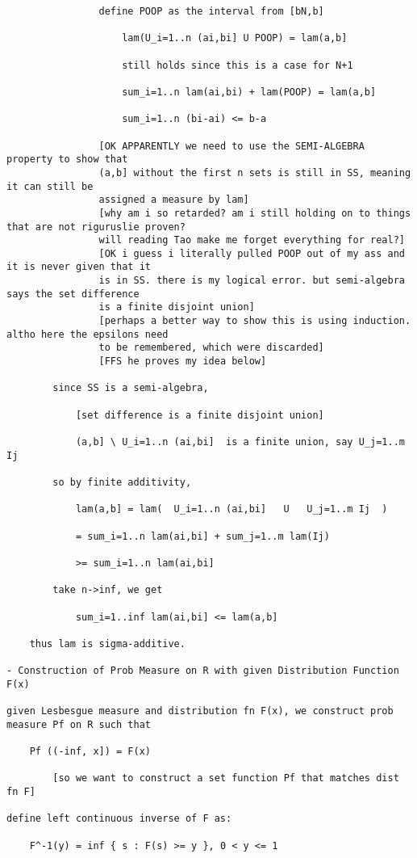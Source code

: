 \documentclass{article}
\begin{document}
\begin{flushleft}
\begin{verbatim}
				define POOP as the interval from [bN,b]
				
					lam(U_i=1..n (ai,bi] U POOP) = lam(a,b] 
					
					still holds since this is a case for N+1
					
					sum_i=1..n lam(ai,bi) + lam(POOP) = lam(a,b]
					
					sum_i=1..n (bi-ai) <= b-a
					
				[OK APPARENTLY we need to use the SEMI-ALGEBRA property to show that
				(a,b] without the first n sets is still in SS, meaning it can still be
				assigned a measure by lam]
				[why am i so retarded? am i still holding on to things that are not riguruslie proven?
				will reading Tao make me forget everything for real?]
				[OK i guess i literally pulled POOP out of my ass and it is never given that it
				is in SS. there is my logical error. but semi-algebra says the set difference
				is a finite disjoint union]
				[perhaps a better way to show this is using induction. altho here the epsilons need
				to be remembered, which were discarded]
				[FFS he proves my idea below]
			
		since SS is a semi-algebra, 
		
			[set difference is a finite disjoint union]
		
			(a,b] \ U_i=1..n (ai,bi]  is a finite union, say U_j=1..m Ij 
			
		so by finite additivity,
		
			lam(a,b] = lam(  U_i=1..n (ai,bi]   U   U_j=1..m Ij  ) 
			
			= sum_i=1..n lam(ai,bi] + sum_j=1..m lam(Ij)
			
			>= sum_i=1..n lam(ai,bi]
			
		take n->inf, we get
		
			sum_i=1..inf lam(ai,bi] <= lam(a,b]
			
	thus lam is sigma-additive.

- Construction of Prob Measure on R with given Distribution Function F(x)

given Lesbesgue measure and distribution fn F(x), we construct prob measure Pf on R such that

	Pf ((-inf, x]) = F(x)
	
		[so we want to construct a set function Pf that matches dist fn F]
	
define left continuous inverse of F as:

	F^-1(y) = inf { s : F(s) >= y }, 0 < y <= 1


\end{verbatim}
\end{flushleft}
\end{document}
